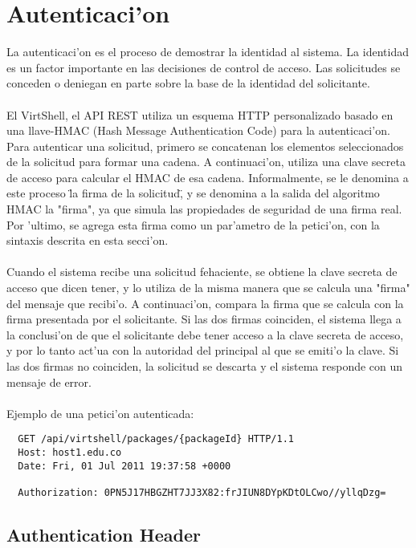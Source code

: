\section{Autenticaci'on}

La autenticaci'on es el proceso de demostrar la identidad al sistema. La identidad es un factor importante en las decisiones de control de acceso. Las solicitudes se conceden o deniegan en parte sobre la base de la identidad del solicitante.\\
\\
El VirtShell, el API REST utiliza un esquema HTTP personalizado basado en una llave-HMAC (Hash Message Authentication Code) para la autenticaci'on. Para autenticar una solicitud, primero se concatenan los elementos seleccionados de la solicitud para formar una cadena. A continuaci'on, utiliza una clave secreta de acceso para calcular el HMAC de esa cadena. Informalmente, se le denomina a este proceso \"la firma de la solicitud\", y se denomina a la salida del algoritmo HMAC la "firma", ya que simula las propiedades de seguridad de una firma real. Por 'ultimo, se agrega esta firma como un par'ametro de la petici'on, con la sintaxis descrita en esta secci'on.\\
\\
Cuando el sistema recibe una solicitud fehaciente, se obtiene la clave secreta de acceso que dicen tener, y lo utiliza de la misma manera que se calcula una "firma" del mensaje que recibi'o. A continuaci'on, compara la firma que se calcula con la firma presentada por el solicitante. Si las dos firmas coinciden, el sistema llega a la conclusi'on de que el solicitante debe tener acceso a la clave secreta de acceso, y por lo tanto act'ua con la autoridad del principal al que se emiti'o la clave. Si las dos firmas no coinciden, la solicitud se descarta y el sistema responde con un mensaje de error.\\
\\
Ejemplo de una petici'on autenticada:

\medskip
\begin{lstlisting}
  GET /api/virtshell/packages/{packageId} HTTP/1.1
  Host: host1.edu.co
  Date: Fri, 01 Jul 2011 19:37:58 +0000

  Authorization: 0PN5J17HBGZHT7JJ3X82:frJIUN8DYpKDtOLCwo//yllqDzg= 
\end{lstlisting}

\subsection{Authentication Header}


